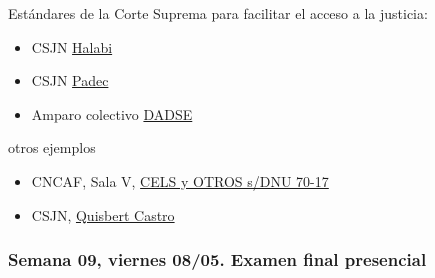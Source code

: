 \documentclass[
]{article}
\begin{document}
Estándares de la Corte Suprema para facilitar el acceso a la justicia:

\begin{itemize}
\item
  CSJN
  \href{https://drive.google.com/file/d/1EcDi8VnbuUNH7DlaRPhTMit0IGLLGn0d/view?usp=sharing}{Halabi}
\item
  CSJN
  \href{https://drive.google.com/file/d/186eN_fSToqx4d_W2fRI2pckZA3a5CWCH/view?usp=sharing}{Padec}
\item
  Amparo colectivo
  \href{https://drive.google.com/file/d/1JKvY_Tlo8fV1MUStzKk_WLW_QkCFG1LG/view?usp=sharing}{DADSE}
\end{itemize}

otros ejemplos

\begin{itemize}
\item
  CNCAF, Sala V,
  \href{https://drive.google.com/file/d/1j4N1FxaCWPwVycMh9KS32oLPEqx-vAac/view?usp=sharing}{CELS
  y OTROS s/DNU 70-17}
\item
  CSJN,
  \href{https://drive.google.com/file/d/1kepRDLt6tK6OjOfKD_d4vBkkivAKNYHk/view?usp=sharing}{Quisbert
  Castro}
\end{itemize}

\subsubsection{Semana 09, viernes 08/05. Examen final
presencial}\label{semana-09-viernes-0805.-examen-final-presencial}
\end{document}
